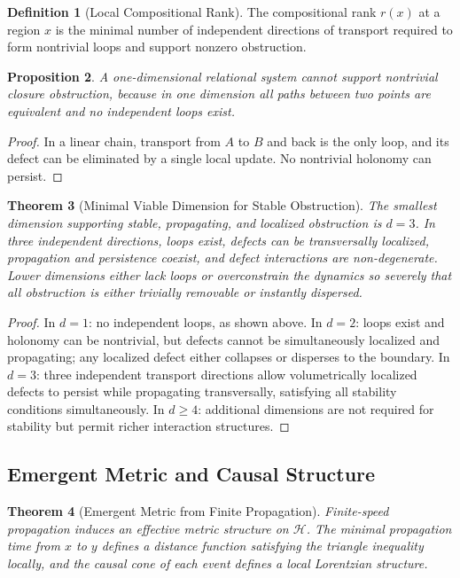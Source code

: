 \documentclass[12pt,a4paper,openany]{book}
\theoremstyle{plain}
\newtheorem{theorem}{Theorem}[chapter]
\newtheorem{proposition}[theorem]{Proposition}
\theoremstyle{definition}
\newtheorem{definition}[theorem]{Definition}
\theoremstyle{remark}
\begin{document}
\begin{definition}[Local Compositional Rank]
The compositional rank $r(x)$ at a region $x$ is the minimal number of independent directions of transport required to form nontrivial loops and support nonzero obstruction.
\end{definition}

\begin{proposition}
A one-dimensional relational system cannot support nontrivial closure obstruction, because in one dimension all paths between two points are equivalent and no independent loops exist.
\end{proposition}

\begin{proof}
In a linear chain, transport from $A$ to $B$ and back is the only loop, and its defect can be eliminated by a single local update. No nontrivial holonomy can persist.
\end{proof}

\begin{theorem}[Minimal Viable Dimension for Stable Obstruction]
The smallest dimension supporting stable, propagating, and localized obstruction is $d = 3$. In three independent directions, loops exist, defects can be transversally localized, propagation and persistence coexist, and defect interactions are non-degenerate. Lower dimensions either lack loops or overconstrain the dynamics so severely that all obstruction is either trivially removable or instantly dispersed.
\end{theorem}

\begin{proof}
In $d = 1$: no independent loops, as shown above. In $d = 2$: loops exist and holonomy can be nontrivial, but defects cannot be simultaneously localized and propagating; any localized defect either collapses or disperses to the boundary. In $d = 3$: three independent transport directions allow volumetrically localized defects to persist while propagating transversally, satisfying all stability conditions simultaneously. In $d \geq 4$: additional dimensions are not required for stability but permit richer interaction structures.
\end{proof}

\subsection{Emergent Metric and Causal Structure}

\begin{theorem}[Emergent Metric from Finite Propagation]
Finite-speed propagation induces an effective metric structure on $\mathcal{H}$. The minimal propagation time from $x$ to $y$ defines a distance function satisfying the triangle inequality locally, and the causal cone of each event defines a local Lorentzian structure.
\end{theorem}
\end{document}

